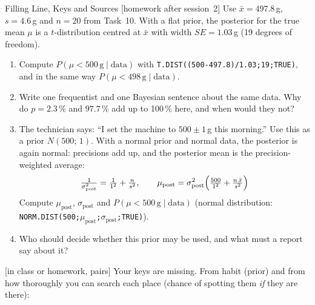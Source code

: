 \begin{uebungsblattc}{Filling Line, Keys and Sources}
\newpage
{}[homework after session~2]
Use $\bar{x}=497.8$\,g, $s=4.6$\,g and $n=20$ from Task~10.
With a flat prior, the posterior for the true mean $\mu$ is a
$t$-distribution centred at $\bar{x}$ with width
$\mathit{SE}=1.03$\,g (19 degrees of freedom).
\begin{enumerate}
  \item Compute $P(\mu<500\,\text{g}\mid\text{data})$ with
    \texttt{T.DIST((500-497.8)/1.03;19;TRUE)}, and in the same way
    $P(\mu<498\,\text{g}\mid\text{data})$.
  \item Write one frequentist and one Bayesian sentence about the same
    data. Why do $p=2.3\,\%$ and $97.7\,\%$ add up to 100\,\% here, and
    when would they not?
  \item The technician says: \enquote{I set the machine to
    $500\pm1$\,g this morning.} Use this as a prior $N(500;\,1)$. With
    a normal prior and normal data, the posterior is again normal:
    precisions add up, and the posterior mean is the precision-weighted
    average:
    \[\tfrac{1}{\sigma^2_{\text{post}}}=\tfrac{1}{1^2}+\tfrac{n}{s^2},\qquad
      \mu_{\text{post}}=\sigma^2_{\text{post}}\Bigl(\tfrac{500}{1^2}+\tfrac{n\,\bar{x}}{s^2}\Bigr)\]
    Compute $\mu_{\text{post}}$, $\sigma_{\text{post}}$ and
    $P(\mu<500\,\text{g}\mid\text{data})$ (normal distribution:
    \texttt{NORM.DIST(500;$\mu_{\text{post}}$;$\sigma_{\text{post}}$;TRUE)}).
  \item Who should decide whether this prior may be used, and what must
    a report say about it?
\end{enumerate}

[in class or homework, pairs]
Your keys are missing. From habit (prior) and from how thoroughly you can
search each place (chance of spotting them \emph{if} they are there):


\end{uebungsblattc}
